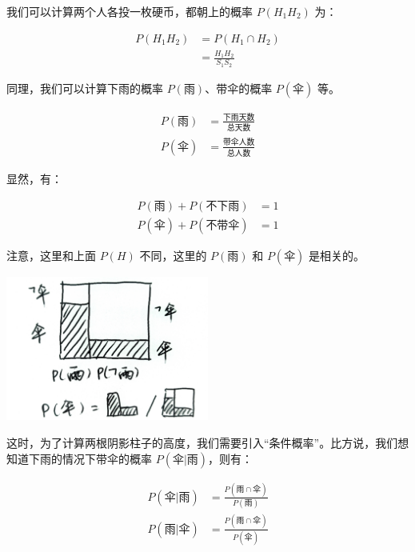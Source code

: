 \documentclass[UTF8]{ctexart}
\begin{document}
我们可以计算两个人各投一枚硬币，都朝上的概率 $P(H_1 H_2)$ 为：

\begin{equation}
	\begin{aligned}
		P(H_1 H_2) & = P(H_1 \cap H_2)         \\
		           & = \frac{H_1 H_2}{S_1 S_2}
	\end{aligned}
\end{equation}

同理，我们可以计算下雨的概率 $P(\text{雨})$、带伞的概率 $P(\text{伞})$ 等。

\begin{equation}
	\begin{aligned}
		P(\text{雨}) & = \frac{\text{下雨天数}}{\text{总天数}} \\
		P(\text{伞}) & = \frac{\text{带伞人数}}{\text{总人数}}
	\end{aligned}
\end{equation}

显然，有：

\begin{equation}
	\begin{aligned}
		P(\text{雨}) + P(\text{不下雨}) & = 1 \\
		P(\text{伞}) + P(\text{不带伞}) & = 1
	\end{aligned}
\end{equation}

注意，这里和上面 $P(H)$ 不同，这里的 $P(\text{雨})$ 和 $P(\text{伞})$ 是相关的。

\begin{center}
	\includegraphics[width=0.5\textwidth]{fig4.jpg}
\end{center}

这时，为了计算两根阴影柱子的高度，我们需要引入“条件概率”。比方说，我们想知道下雨的情况下带伞的概率 $P(\text{伞}|\text{雨})$，则有：

\begin{equation}
	\begin{aligned}
		P(\text{伞}|\text{雨}) & = \frac{P(\text{雨} \cap \text{伞})}{P(\text{雨})} \\
		P(\text{雨}|\text{伞}) & = \frac{P(\text{雨} \cap \text{伞})}{P(\text{伞})}
	\end{aligned}
\end{equation}
\end{document}
